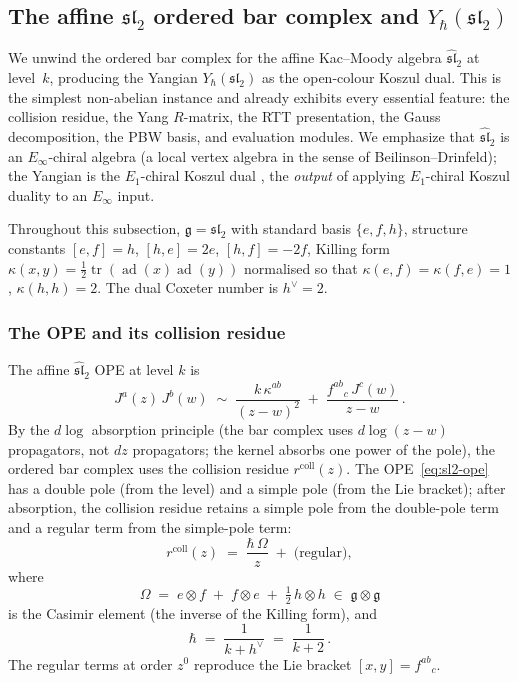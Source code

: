 
\subsection{The affine $\mathfrak{sl}_2$ ordered bar complex
and $Y_\hbar(\mathfrak{sl}_2)$}
\label{subsec:sl2-yangian}

We unwind the ordered bar complex for the affine Kac--Moody algebra
$\widehat{\mathfrak{sl}}_2$ at level~$k$, producing the Yangian
$Y_\hbar(\mathfrak{sl}_2)$ as the open-colour Koszul dual. This is
the simplest non-abelian instance and already exhibits every essential
feature: the collision residue, the Yang $R$-matrix, the RTT
presentation, the Gauss decomposition, the PBW basis, and evaluation
modules. We emphasize that $\widehat{\mathfrak{sl}}_2$ is an
$E_\infty$-chiral algebra (a local vertex algebra in the sense of
Beilinson--Drinfeld); the Yangian is the $E_1$-chiral Koszul dual
, the \emph{output} of applying $E_1$-chiral Koszul duality to an
$E_\infty$ input.

Throughout this subsection, $\mathfrak g=\mathfrak{sl}_2$ with standard
basis $\{e,f,h\}$, structure constants $[e,f]=h$, $[h,e]=2e$,
$[h,f]=-2f$, Killing form $\kappa(x,y)=\tfrac12\operatorname{tr}(\operatorname{ad}(x)\operatorname{ad}(y))$
normalised so that
$\kappa(e,f)=\kappa(f,e)=1$, $\kappa(h,h)=2$. The dual
Coxeter number is $h^\vee=2$.

\subsubsection*{The OPE and its collision residue}

The affine $\widehat{\mathfrak{sl}}_2$ OPE at level $k$ is
\begin{equation}\label{eq:sl2-ope}
J^a(z)\,J^b(w)\;\sim\;
\frac{k\,\kappa^{ab}}{(z-w)^2}\;+\;\frac{f^{ab}{}_c\,J^c(w)}{z-w}\,.
\end{equation}
By the $d\log$ absorption principle (the bar complex uses $d\log(z{-}w)$
propagators, not $dz$ propagators; the kernel absorbs one power of the
pole), the ordered bar complex uses
the collision residue $r^{\mathrm{coll}}(z)$. The OPE~\eqref{eq:sl2-ope}
has a double pole (from the level) and a simple pole (from the Lie
bracket); after absorption, the collision residue retains a simple pole
from the double-pole term and a regular term from the simple-pole term:
\begin{equation}\label{eq:sl2-collision-residue}
r^{\mathrm{coll}}(z)\;=\;\frac{\hbar\,\Omega}{z}\;+\;\text{(regular)},
\end{equation}
where
\begin{equation}\label{eq:sl2-casimir}
\Omega\;=\;e\otimes f\;+\;f\otimes e\;+\;\tfrac12\,h\otimes h
\;\in\;\mathfrak g\otimes\mathfrak g
\end{equation}
is the Casimir element (the inverse of the Killing form), and
\begin{equation}\label{eq:sl2-hbar}
\hbar\;=\;\frac{1}{k+h^\vee}\;=\;\frac{1}{k+2}\,.
\end{equation}
The regular terms at order $z^0$ reproduce the Lie bracket
$[x,y]=f^{ab}{}_c$.

